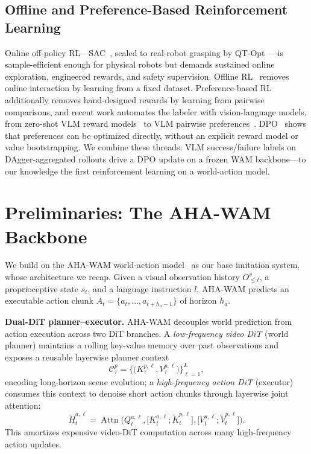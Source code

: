 \documentclass[letterpaper, 10pt, conference]{ieeeconf}
\begin{document}
\subsection{Offline and Preference-Based Reinforcement Learning}
Online off-policy RL---SAC~\cite{haarnoja2018soft}, scaled to real-robot grasping by QT-Opt~\cite{kalashnikov2018qtopt}---is sample-efficient enough for physical robots but demands sustained online exploration, engineered rewards, and safety supervision. Offline RL~\cite{kostrikov2022iql} removes online interaction by learning from a fixed dataset. Preference-based RL~\cite{christiano2017preferences} additionally removes hand-designed rewards by learning from pairwise comparisons, and recent work automates the labeler with vision-language models, from zero-shot VLM reward models~\cite{rocamonde2024vlmrm} to VLM pairwise preferences~\cite{wang2024rlvmlf}. DPO~\cite{rafailov2023dpo} shows that preferences can be optimized directly, without an explicit reward model or value bootstrapping. We combine these threads: VLM success/failure labels on DAgger-aggregated rollouts drive a DPO update on a frozen WAM backbone---to our knowledge the first reinforcement learning on a world-action model.

\section{Preliminaries: The AHA-WAM Backbone}
\label{sec:preliminaries}

We build on the AHA-WAM world-action model~\cite{ahawam} as our base imitation system, whose architecture we recap. Given a visual observation history $O^{v}_{\le t}$, a proprioceptive state $s_t$, and a language instruction $l$, AHA-WAM predicts an executable action chunk $A_t=\{a_t,\dots,a_{t+h_a-1}\}$ of horizon $h_a$.

\textbf{Dual-DiT planner--executor.} AHA-WAM decouples world prediction from action execution across two DiT branches. A \emph{low-frequency video DiT} (world planner) maintains a rolling key-value memory over past observations and exposes a reusable layerwise planner context
\begin{equation}
\mathcal{C}^{p}_{\tau} = \big\{\big(K^{p,\ell}_{\tau}, V^{p,\ell}_{\tau}\big)\big\}_{\ell=1}^{L},
\label{eq:planner_ctx}
\end{equation}
encoding long-horizon scene evolution; a \emph{high-frequency action DiT} (executor) consumes this context to denoise short action chunks through layerwise joint attention:
\begin{equation}
\tilde{H}^{a,\ell}_{t} = \operatorname{Attn}\Big(Q^{a,\ell}_{t},\big[K^{a,\ell}_{t};\tilde{K}^{p,\ell}_{t}\big],\big[V^{a,\ell}_{t};\tilde{V}^{p,\ell}_{t}\big]\Big).
\label{eq:joint_attn}
\end{equation}
This amortizes expensive video-DiT computation across many high-frequency action updates.
\end{document}
